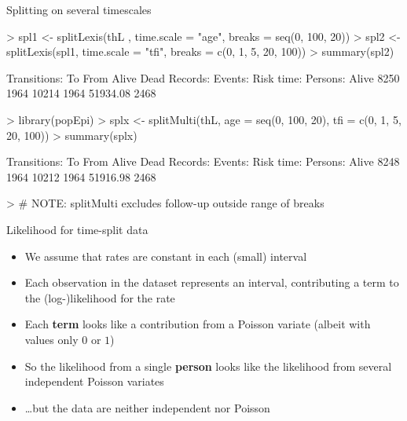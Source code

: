 \begin{frame}[fragile]{Splitting on several timescales}
\vspace*{-1em}
\begin{Schunk}
\begin{Sinput}
> spl1 <- splitLexis(thL , time.scale = "age", breaks = seq(0, 100, 20))
> spl2 <- splitLexis(spl1, time.scale = "tfi", breaks = c(0, 1, 5, 20, 100))
> summary(spl2)
\end{Sinput}
\begin{Soutput}
Transitions:
     To
From    Alive Dead  Records:  Events: Risk time:  Persons:
  Alive  8250 1964     10214     1964   51934.08      2468
\end{Soutput}
\begin{Sinput}
> library(popEpi)
> splx <- splitMulti(thL, age = seq(0, 100, 20), tfi = c(0, 1, 5, 20, 100))
> summary(splx)
\end{Sinput}
\begin{Soutput}
Transitions:
     To
From    Alive Dead  Records:  Events: Risk time:  Persons:
  Alive  8248 1964     10212     1964   51916.98      2468
\end{Soutput}
\begin{Sinput}
> # NOTE: splitMulti excludes follow-up outside range of breaks
\end{Sinput}
\end{Schunk}
\end{frame}

\begin{frame}[fragile]{Likelihood for time-split data}
  \begin{itemize}[<+->]
  \item We assume that rates are constant in each (small) interval
  \item Each observation in the dataset represents an interval,
    contributing a term to the (log-)likelihood for the rate
  \item Each \textbf{term} \alert<4->{looks like} a contribution from a Poisson variate
    (albeit with values only $0$ or $1$)
  \item So the likelihood from a single \textbf{person}
    \alert<4->{looks like} the likelihood from several independent
    Poisson variates
  \item \ldots but the data are neither independent nor Poisson
  \end{itemize}
\end{frame}

